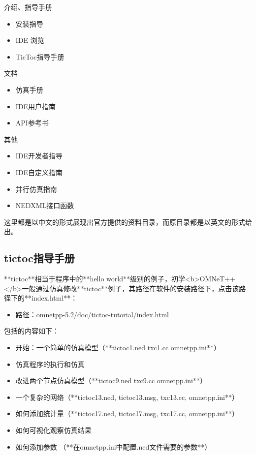 介绍、指导手册
\begin{itemize}
\item 安装指导
\item IDE 浏览
\item TicToc指导手册
\end{itemize}

文档
\begin{itemize}
	\item 仿真手册
	\item IDE用户指南
	\item API参考书
\end{itemize}

其他
\begin{itemize}
	\item IDE开发者指导
	\item IDE自定义指南
	\item 并行仿真指南
	\item NEDXML接口函数 
\end{itemize}

这里都是以中文的形式展现出官方提供的资料目录，而原目录都是以英文的形式给出。\\

\subsection{tictoc指导手册}
**tictoc**相当于程序中的**hello world**级别的例子，初学<b>OMNeT++</b>一般通过仿真修改**tictoc**例子，其路径在软件的安装路径下，点击该路径下的**index.html**：

\begin{itemize}
	\item 路径：omnetpp-5.2/doc/tictoc-tutorial/index.html 
\end{itemize}

包括的内容如下：
\begin{itemize}
	\item 开始：一个简单的仿真模型（**tictoc1.ned txc1.cc omnetpp.ini**）
	\item 仿真程序的执行和仿真
	\item 改进两个节点仿真模型（**tictoc9.ned txc9.cc omnetpp.ini**）
	\item 一个复杂的网络（**tictoc13.ned, tictoc13.msg, txc13.cc, omnetpp.ini**）
	\item 如何添加统计量（**tictoc17.ned, tictoc17.msg, txc17.cc, omnetpp.ini**）
	\item 如何可视化观察仿真结果
	\item 如何添加参数 （**在omnetpp.ini中配置.ned文件需要的参数**）\\
\end{itemize}

